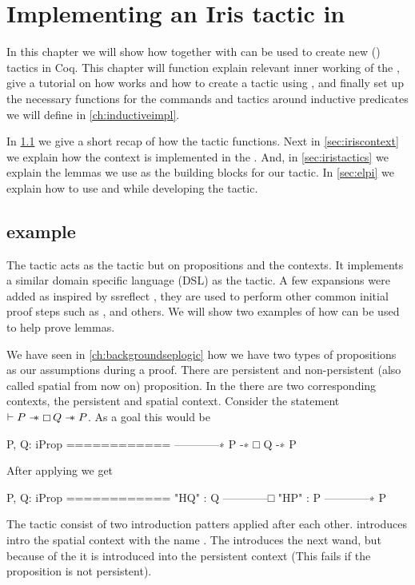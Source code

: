 \documentclass[thesis.tex]{subfiles}
\begin{document}
\VerbatimFootnotes

\chapter{Implementing an Iris tactic in \elpi}
In this chapter we will show how \elpi together with \ce can be used to create new (\IPM) tactics in Coq.
This chapter will function explain relevant inner working of the \IPM, give a tutorial on how \elpi works and how to create a tactic using \ce, and finally set up the necessary functions for the commands and tactics around inductive predicates we will define in \cref{ch:inductiveimpl}.

In \cref{sec:introsex} we give a short recap of how the  tactic functions. Next in \cref{sec:iriscontext} we explain how the \iris context is implemented in the \IPM. And, in \cref{sec:iristactics} we explain the \iris lemmas we use as the building blocks for our tactic. In \cref{sec:elpi} we explain how to use \elpi and \ce while developing the  tactic.


\section[iIntros example]{ example}\label{sec:introsex}
The \IPM {} tactic acts as the  tactic but on \iris propositions and the \iris contexts. It implements a similar domain specific language (DSL) as the \coq tactic. A few expansions were added as inspired by ssreflect \cite*{huetCoqProofAssistant1997, gonthierSmallScaleReflection2016}, they are used to perform other common initial proof steps such as ,  and others. We will show two examples of how  can be used to help prove lemmas.

We have seen in \cref{ch:backgroundseplogic} how we have two types of propositions as our assumptions during a proof. There are persistent and non-persistent (also called spatial from now on) proposition.
In the \IPM there are two corresponding contexts, the persistent and spatial context. Consider the statement $\vdash P \mathrel{-\!\!\ast} \mathop{\boxempty}Q \mathrel{-\!\!\ast} P$. As a \coq goal this would be
\begin{coqcode}
  P, Q: iProp
  ============
  ------------∗
  P -∗ □ Q -∗ P
\end{coqcode}
After applying  we get
\begin{coqcode}
  P, Q: iProp
  ============
  "HQ" : Q
  ------------□
  "HP" : P
  ------------∗
  P
\end{coqcode}
The tactic  consist of two introduction patters applied after each other.  introduces  intro the spatial context with the name . The  introduces the next wand, but because of the \coqi{#} it is introduced into the persistent context (This fails if the proposition is not persistent).
\end{document}
